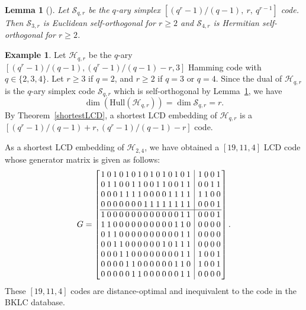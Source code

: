 \documentclass{article}
\newtheorem{lemma}[theorem]{Lemma}
\theoremstyle{definition}
\newtheorem{example}[definition]{Example}
\theoremstyle{remark}
\begin{document}
\begin{lemma}[\cite{Araya-quaternary-LCD,Niederreiter-ternary-simplex}]\label{simplex-orthogonal}
Let $\mathcal{S}_{q, r}$ be the $q$-ary simplex $[(q^r-1)/(q-1),~ r,~ q^{r-1}]$ code. Then $\mathcal{S}_{3, r}$ is Euclidean self-orthogonal for $r\ge 2$ and $\mathcal{S}_{4, r}$ is Hermitian self-orthogonal for $r\ge 2$.
\end{lemma}


\begin{example}
Let $\mathcal{H}_{q, r}$ be the $q$-ary $[(q^r-1)/(q-1), (q^r-1)/(q-1)-r, 3]$ Hamming code with $q\in\{2, 3, 4\}$. Let $r\ge 3$ if $q=2$, and $r\ge 2$ if $q=3$ or $q=4$. Since the dual of $\mathcal{H}_{q, r}$ is the $q$-ary simplex code $\mathcal{S}_{q, r}$ which is self-orthogonal by Lemma~\ref{simplex-orthogonal}, we have
\[
\dim(\text{Hull}(\mathcal{H}_{q, r}))=\dim\mathcal{S}_{q, r}=r.
\]
By Theorem~\ref{shortestLCD}, a shortest LCD embedding of $\mathcal{H}_{q, r}$ is a $[(q^r-1)/(q-1)+r, (q^r-1)/(q-1)-r]$ code.

As a shortest LCD embedding of $\mathcal{H}_{2, 4}$, we have obtained a $[19, 11, 4]$ LCD code whose generator matrix is given as follows:
    \[
    \setlength{\arraycolsep}{1.2pt}
    G=\left[
    \begin{array}{ccccccccccccccc|cccc}
    1&0 & 1 & 0 & 1 & 0 & 1 & 0 & 1 & 0 & 1 & 0 & 1 & 0 & 1 ~&~ 1 & 0 & 0 & 1 \\
    0 & 1 & 1 & 0 & 0 & 1 & 1 & 0 & 0 & 1 & 1 & 0 & 0 & 1 & 1 ~&~ 0 & 0 & 1 & 1 \\
    0 & 0 & 0 & 1 & 1 & 1 & 1 & 0 & 0 & 0 & 0 & 1 & 1 & 1 & 1 ~&~ 1 & 1 & 0 & 0 \\
    0 & 0 & 0 & 0 & 0 & 0 & 0 & 1 & 1 & 1 & 1 & 1 & 1 & 1 & 1 ~&~ 0 & 0 & 0 & 1 \\
    \hline
    1 & 0 & 0 & 0 & 0 & 0 & 0 & 0 & 0 & 0 & 0 & 0 & 0 & 1 & 1 ~&~ 0 & 0 & 0 & 1 \\
    1 & 1 & 0 & 0 & 0 & 0 & 0 & 0 & 0 & 0 & 0 & 0 & 1 & 1 & 0 ~&~ 0 & 0 & 0 & 0 \\
    0 & 1 & 1 & 0 & 0 & 0 & 0 & 0 & 0 & 0 & 0 & 0 & 0 & 1 & 1 ~&~ 0 & 0 & 0 & 0 \\
    0 & 0 & 1 & 1 & 0 & 0 & 0 & 0 & 0 & 0 & 1 & 0 & 1 & 1 & 1 ~&~ 0 & 0 & 0 & 0 \\
    0 & 0 & 0 & 1 & 1 & 0 & 0 & 0 & 0 & 0 & 0 & 0 & 0 & 1 & 1 ~&~ 1 & 0 & 0 & 1 \\
    0 & 0 & 0 & 0 & 1 & 1 & 0 & 0 & 0 & 0 & 0 & 0 & 1 & 1 & 0 ~&~ 1 & 0 & 0 & 1 \\
    0 & 0 & 0 & 0 & 0 & 1 & 1 & 0 & 0 & 0 & 0 & 0 & 0 & 1 & 1 ~&~ 0 & 0 & 0 & 0
    \end{array}
    \right].
    \]
These $[19, 11, 4]$ codes are distance-optimal and inequivalent to the code in the BKLC database.
\end{example}
\end{document}
